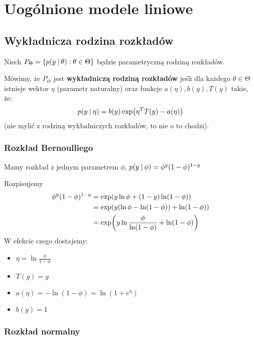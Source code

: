 \section{Uogólnione modele liniowe}

\subsection{Wykładnicza rodzina rozkładów}

\begin{definition}
	Niech \( P_\Theta = \set{p(y \given \theta) : \theta \in \Theta} \) będzie parametryczną rodziną rozkładów.

	Mówimy, że \( P_\Theta \) jest \textbf{wykładniczą rodziną rozkładów} jeśli dla każdego \( \theta \in \Theta \) istnieje wektor \( \eta \) (parametr naturalny) oraz funkcje \( a(\eta), b(y), T(y) \) takie, że:
	\[
		p(y \given \eta) = b(y)\exp\pars{\eta^T T(y) - a(\eta)}
	\]
	(nie mylić z rodziną wykładniczych rozkładów, to nie o to chodzi).
\end{definition}

\subsubsection{Rozkład Bernoulliego}

Mamy rozkład z jednym parametrem \( \phi \), \( p(y \:\vert\: \phi) = \phi^y(1-\phi)^{1-y} \)

Rozpisujemy
\begin{align*}
	\phi^y(1-\phi)^{1-y}
	 & = \exp\pars{y \ln \phi + (1 - y) \ln (1 - \phi)}                \\
	 & = \exp\pars{y (\ln \phi - \ln (1 - \phi)) + \ln (1 - \phi)}     \\
	 & = \exp\pars{y \ln \frac{\phi}{\ln (1 - \phi)} + \ln (1 - \phi)} \\
\end{align*}
W efekcie czego dostajemy:
\begin{itemize}
	\item \( \eta = \ln \frac{\phi}{1 - \phi} \)
	\item \( T(y) = y \)
	\item \( a(\eta) = -\ln(1 - \phi) = \ln(1 + e^\eta) \)
	\item \( b(y) = 1 \)
\end{itemize}

\subsubsection{Rozkład normalny}


